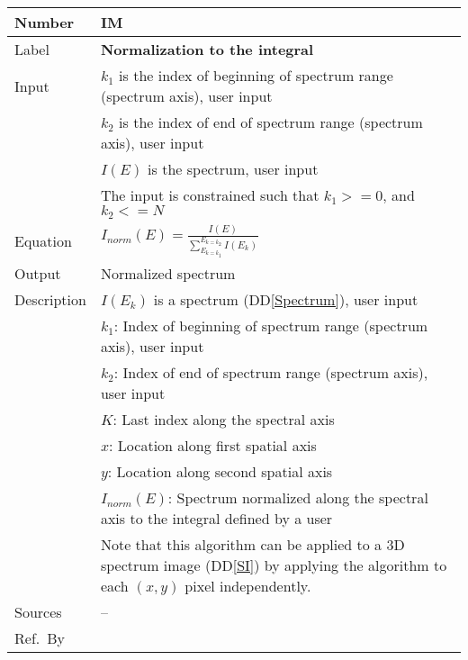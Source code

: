 \documentclass[12pt]{article}
\newcommand{\colAwidth}{0.13\textwidth}
\newcommand{\colBwidth}{0.82\textwidth}
\newcommand{\ddref}[1]{DD\ref{#1}}
\newcounter{instnum} %
\begin{document}

\noindent
\begin{minipage}{\textwidth}
	\renewcommand*{\arraystretch}{1.5}
	\begin{tabular}{| p{\colAwidth} | p{\colBwidth}|}
		  \hline
		  \rowcolor[gray]{0.9}
		  Number& IM{instnum}\theinstnum \label{normalization}\\
		  \hline
		  Label& \bf Normalization to the integral\\
		  \hline
		  Input& $k_1$  is the index of beginning of spectrum range (spectrum axis), user input\\
		  & $k_2$ is the index of end of spectrum range (spectrum axis), user input\\
		  & $I(E)$ is the spectrum, user input\\
		  & The input is constrained such that $k_1 >= 0$, and $k_2 <= N$\\
		  \hline
		  Equation & $I_{norm}(E)=\frac{I(E)}{\sum_{E_{k=k_1}}^{E_{k=k_2}} I(E_k)}$\\
		  \hline
		  Output & Normalized spectrum\\
		  \hline
		  Description&$I(E_k)$ is a spectrum (\ddref{Spectrum}), user input\\
		  &$k_1$: Index of beginning of spectrum range (spectrum axis), user input\\
		  &$k_2$: Index of end of spectrum range (spectrum axis), user input\\
		  &$K$: Last index along the spectral axis\\
		  &$x$: Location along first spatial axis\\
		  &$y$: Location along second spatial axis\\
		  &$I_{norm}(E)$: Spectrum normalized along the spectral axis to the integral defined by a user\\
		  & Note that this algorithm can be applied to a 3D spectrum image (\ddref{SI}) by applying the algorithm to each $(x,y)$ pixel independently.\\
		  \hline
		  Sources & -- \\
		  \hline
		  Ref.\ By & \\
		  \hline
	\end{tabular}
\end{minipage}\\

~\newline

\end{document}
